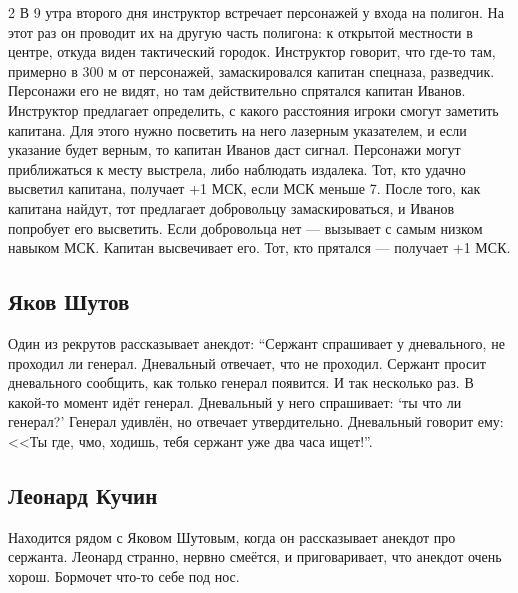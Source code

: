 \documentclass[twoside]{article}
\begin{document}
\begin{multicols}{2}
В 9 утра второго дня инструктор встречает персонажей у входа на полигон.
На этот раз он проводит их на другую часть полигона: к открытой
местности в центре, откуда виден тактический городок. Инструктор
говорит, что где-то там, примерно в 300 м от персонажей, замаскировался
капитан спецназа, разведчик. Персонажи его не видят, но там
действительно спрятался капитан Иванов. Инструктор предлагает
определить, с какого расстояния игроки смогут заметить капитана. Для
этого нужно посветить на него лазерным указателем, и если указание будет
верным, то капитан Иванов даст сигнал. Персонажи могут приближаться к
месту выстрела, либо наблюдать издалека. Тот, кто удачно высветил
капитана, получает +1 МСК, если МСК меньше 7. После того, как капитана
найдут, тот предлагает добровольцу замаскироваться, и Иванов попробует
его высветить. Если добровольца нет --- вызывает с самым низком навыком
МСК. Капитан высвечивает его. Тот, кто прятался --- получает +1 МСК.

\subsection{Яков Шутов}\label{yakov-shutov}

Один из рекрутов рассказывает анекдот: \enquote{Сержант спрашивает у
дневального, не проходил ли генерал. Дневальный отвечает, что не
проходил. Сержант просит дневального сообщить, как только генерал
появится. И так несколько раз. В какой-то момент идёт генерал.
Дневальный у него спрашивает: \enquote{ты что ли генерал?} Генерал удивлён, но
отвечает утвердительно. Дневальный говорит ему: <<Ты где, чмо, ходишь,
тебя сержант уже два часа ищет!}.

\subsection{Леонард Кучин}\label{leonard-kuchin}

Находится рядом с Яковом Шутовым, когда он рассказывает анекдот про
сержанта. Леонард странно, нервно смеётся, и приговаривает, что анекдот
очень хорош. Бормочет что-то себе под нос.


\end{multicols}
\end{document}
